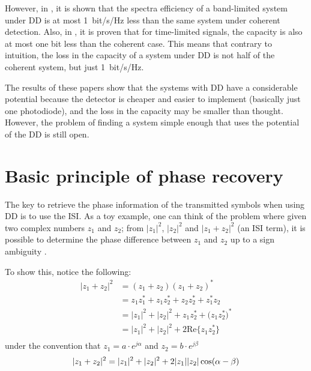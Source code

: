 However, in \cite{Mecozzi_2018}, it is shown that the spectra efficiency of a band-limited system under DD is at most \SI{1}{bit/\s/\Hz} less than the same system under coherent detection. Also, in \cite{Tasbihi_Capacity}, it is proven that for time-limited signals, the capacity is also at most one bit less than the coherent case. This means that contrary to intuition, the loss in the capacity of a system under DD is not half of the coherent system, but just \SI{1}{bit/\s/\Hz}.

The results of these papers show that the systems with DD have a considerable potential because the detector is cheaper and easier to implement (basically just one photodiode), and the loss in the capacity may be smaller than thought. However, the problem of finding a system simple enough that uses the potential of the DD is still open. 



\section{Basic principle of phase recovery}

The key to retrieve the phase information of the transmitted symbols when using DD is to use the ISI. As a toy example, one can think of the problem where given two complex numbers $z_1$ and $z_2$; from $|z_1|^2$, $|z_2|^2$ and $|z_1+z_2|^2$ (an ISI term), it is possible to determine the phase difference between $z_1$ and $z_2$ up to a sign ambiguity \cite{Tasbihi_Tukey}.%
%

To show this, notice the following:
\begin{align*}
	|z_1+z_2|^2 &= (z_1+z_2)(z_1+z_2)^* \\
	&=z_1z_1^*+z_1z_2^*+z_2z_2^*+z_1^*z_2\\
	&=|z_1|^2+|z_2|^2+z_1z_2^*+\bigl(z_1z_2^*\bigr)^*\\
	&=|z_1|^2+|z_2|^2+2\text{Re}\{z_1z_2^*\}\\
\end{align*}%
%
%
under the convention that $z_1 = a\cdot e^{j\alpha}$ and $z_2 = b\cdot e^{j\beta}$%
%
\begin{equation}
	|z_1+z_2|^2 =|z_1|^2+|z_2|^2+2|z_1||z_2|\cos(\alpha-\beta)\\
	\label{eq:square_mag_of_sum}
\end{equation}

